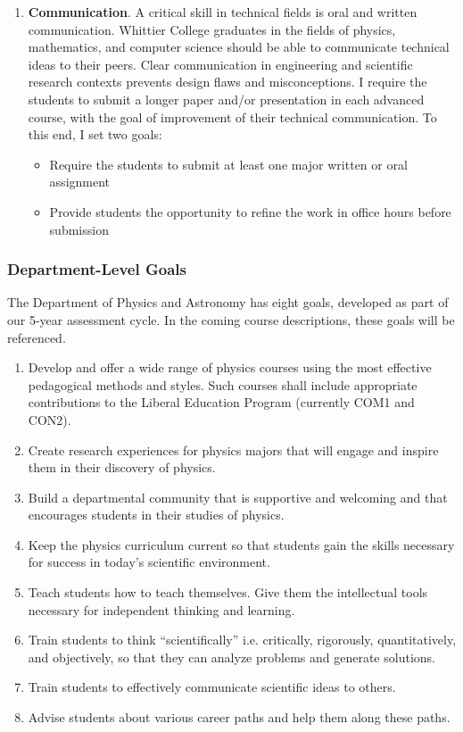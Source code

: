 \documentclass[../../main.tex]{subfiles}
\begin{document}
\begin{enumerate}
\item \textbf{Communication}.  A critical skill in technical fields is oral and written communication.  Whittier College graduates in the fields of physics, mathematics, and computer science should be able to communicate technical ideas to their peers.  Clear communication in engineering and scientific research contexts prevents design flaws and misconceptions.  I require the students to submit a longer paper and/or presentation in each advanced course, with the goal of improvement of their technical communication.  To this end, I set two goals:

\begin{itemize}
\item Require the students to submit at least one major written or oral assignment %
\item Provide students the opportunity to refine the work in office hours before submission %
\end{itemize}

\end{enumerate}

\subsubsection{Department-Level Goals}

The Department of Physics and Astronomy has eight goals, developed as part of our 5-year assessment cycle. In the coming course descriptions, these goals will be referenced.

\begin{enumerate}
\item Develop and offer a wide range of physics courses using the most effective pedagogical methods and styles.  Such courses shall include appropriate contributions to the Liberal Education Program (currently COM1 and CON2).
\item Create research experiences for physics majors that will engage and inspire them in their discovery of physics.
\item Build a departmental community that is supportive and welcoming and that encourages students in their studies of physics.
\item Keep the physics curriculum current so that students gain the skills necessary for success in today’s scientific environment.
\item Teach students how to teach themselves. Give them the intellectual tools necessary for independent thinking and learning.
\item Train students to think ``scientifically'' i.e. critically, rigorously, quantitatively, and objectively, so that they can analyze problems and generate solutions.
\item Train students to effectively communicate scientific ideas to others.
\item Advise students about various career paths and help them along these paths.
\end{enumerate}
\end{document}
